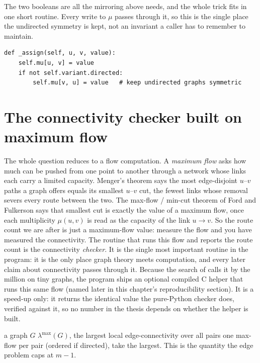 The two booleans are all the mirroring above needs, and the whole trick fits in one short routine. Every write to $\mu$ passes through it, so this is the single place the undirected symmetry is kept, not an invariant a caller has to remember to maintain.

\begin{lstlisting}[caption={How every write keeps an undirected graph symmetric. A directed graph simply skips the mirrored write.}, label={lst:assign}]
def _assign(self, u, v, value):
    self.mu[u, v] = value
    if not self.variant.directed:
        self.mu[v, u] = value   # keep undirected graphs symmetric
\end{lstlisting}

\section{The connectivity checker built on maximum flow}
The whole question reduces to a flow computation. A \emph{maximum flow} asks how much can be pushed from one point to another through a network whose links each carry a limited capacity. Menger's theorem says the most edge-disjoint $u$--$v$ paths a graph offers equals its smallest $u$--$v$ cut, the fewest links whose removal severs every route between the two. The max-flow / min-cut theorem of Ford and Fulkerson \cite{FordFulkerson56} says that smallest cut is exactly the value of a maximum flow, once each multiplicity $\mu(u,v)$ is read as the capacity of the link $u \to v$. So the route count we are after is just a maximum-flow value: measure the flow and you have measured the connectivity. The routine that runs this flow and reports the route count is the connectivity \emph{checker}. It is the single most important routine in the program: it is the only place graph theory meets computation, and every later claim about connectivity passes through it. Because the search of  calls it by the million on tiny graphs, the program ships an optional compiled C helper that runs this same flow (named later in this chapter's reproducibility section). It is a speed-up only: it returns the identical value the pure-Python checker does, verified against it, so no number in the thesis depends on whether the helper is built.

{a graph $G$}
{$\lambda^{\max}(G)$, the largest local edge-connectivity over all pairs}
{one max-flow per pair (ordered if directed), take the largest. This is the quantity the edge problem caps at $m-1$.}

